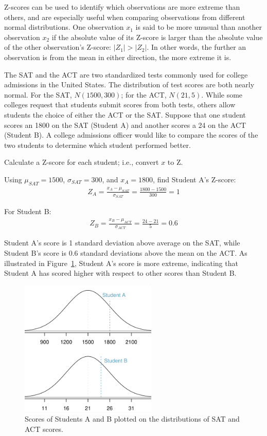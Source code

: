 Z-scores can be used to identify which observations are more extreme than others, and are especially useful when comparing observations from different normal distributions. One observation $x_1$ is said to be more unusual than another observation $x_2$ if the absolute value of its Z-score is larger than the absolute value of the other observation's Z-score: $|Z_1| > |Z_2|$. In other words, the further an observation is from the mean in either direction, the more extreme it is. 

\begin{example}{The SAT and the ACT are two standardized tests commonly used for college admissions in the United States. The distribution of test scores are both nearly normal. For the SAT, $N(1500, 300)$; for the ACT, $N(21, 5)$. While some colleges request that students submit scores from both tests, others allow students the choice of either the ACT or the SAT. Suppose that one student scores an 1800 on the SAT (Student A) and another scores a 24 on the ACT (Student B). A college admissions officer would like to compare the scores of the two students to determine which student performed better.}\label{actSAT}
		
Calculate a Z-score for each student; i.e., convert $x$ to Z.
		
Using $\mu_{SAT}=1500$, $\sigma_{SAT}=300$, and $x_{A}=1800$, find Student A's Z-score:
\begin{align*}
	Z_{A} = \frac{x_{A} - \mu_{SAT}}{\sigma_{SAT}} = \frac{1800-1500}{300} = 1
\end{align*}

For Student B:
\begin{align*}
	Z_{B} = \frac{x_{B} - \mu_{ACT}}{\sigma_{ACT}} = \frac{24 - 21}{5} = 0.6
\end{align*}

Student A's score is 1 standard deviation above average on the SAT, while Student B's score is 0.6 standard deviations above the mean on the ACT. As illustrated in Figure~\ref{satActNormals}, Student A's score is more extreme, indicating that Student A has scored higher with respect to other scores than Student B.
\end{example}

\begin{figure}[h]
\centering
\includegraphics[width=65mm]{ch_distributions_oi_biostat/figures/satActNormals/satActNormals}
\caption{Scores of Students A and B plotted on the distributions of SAT and ACT scores.}
\label{satActNormals}
\end{figure}

